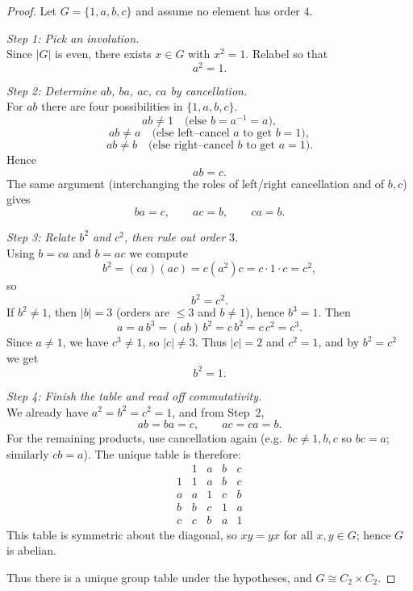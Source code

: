 \documentclass[12pt]{article}
\theoremstyle{definition}
\begin{document}
\begin{proof}
Let $G=\{1,a,b,c\}$ and assume no element has order $4$.

\dotfill

\noindent\emph{Step 1: Pick an involution.}\\

\noindent
Since $|G|$ is even, there exists $x\in G$ with $x^2=1$. Relabel so that
\[
a^2=1.
\]

\dotfill

\noindent\emph{Step 2: Determine $ab$, $ba$, $ac$, $ca$ by cancellation.}\\

\noindent
For $ab$ there are four possibilities in $\{1,a,b,c\}$.
\[
ab\neq 1 \quad\text{(else $b=a^{-1}=a$)},
\]
\[
ab\neq a \quad\text{(else left–cancel $a$ to get $b=1$)},
\]
\[
ab\neq b \quad\text{(else right–cancel $b$ to get $a=1$)}.
\]
Hence
\[
ab=c.
\]
The same argument (interchanging the roles of left/right cancellation and of $b,c$) gives
\[
ba=c,\qquad ac=b,\qquad ca=b.
\]

\dotfill

\noindent\emph{Step 3: Relate $b^2$ and $c^2$, then rule out order $3$.}\\

\noindent
Using $b=ca$ and $b=ac$ we compute
\[
b^2=(ca)(ac)=c(a^2)c=c\cdot 1\cdot c=c^2,
\]
so
\[
b^2=c^2.
\]
If $b^2\ne 1$, then $|b|=3$ (orders are $\le3$ and $b\ne 1$), hence $b^3=1$. Then
\[
a = a\,b^3 = (ab)\,b^2 = c\,b^2 = c\,c^2 = c^3.
\]
Since $a\ne 1$, we have $c^3\ne 1$, so $|c|\ne 3$. Thus $|c|=2$ and $c^2=1$, and by $b^2=c^2$ we get
\[
b^2=1.
\]

\dotfill

\noindent\emph{Step 4: Finish the table and read off commutativity.}\\

\noindent
We already have $a^2=b^2=c^2=1$, and from Step~2,
\[
ab=ba=c,\qquad ac=ca=b.
\]
For the remaining products, use cancellation again (e.g.\ $bc\ne 1,b,c$ so $bc=a$; similarly $cb=a$).
The unique table is therefore:
\[
\begin{array}{c|cccc}
 & 1 & a & b & c\\\hline
1& 1 & a & b & c\\
a& a & 1 & c & b\\
b& b & c & 1 & a\\
c& c & b & a & 1
\end{array}
\]
This table is symmetric about the diagonal, so $xy=yx$ for all $x,y\in G$; hence $G$ is abelian.

\dotfill

Thus there is a unique group table under the hypotheses, and $G\cong C_2\times C_2$.
\end{proof}
\end{document}
